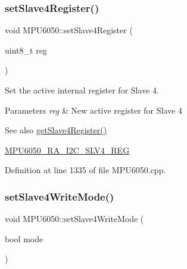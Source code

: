 \subsubsection{\texorpdfstring{setSlave4Register()}{setSlave4Register()}}
{\footnotesize\ttfamily void M\+P\+U6050\+::set\+Slave4\+Register (\begin{DoxyParamCaption}\item[{uint8\+\_\+t}]{reg }\end{DoxyParamCaption})}

Set the active internal register for Slave 4. 
\begin{DoxyParams}{Parameters}
{\em reg} & New active register for Slave 4 \\
\hline
\end{DoxyParams}
\begin{DoxySeeAlso}{See also}
\mbox{\hyperlink{classMPU6050_a7bd548cb60ecceb27c72f026ec0a60f8}{get\+Slave4\+Register()}} 

\mbox{\hyperlink{MPU6050_8h_a5b2f24136f2f68b5d42652d16208d9d0}{M\+P\+U6050\+\_\+\+R\+A\+\_\+\+I2\+C\+\_\+\+S\+L\+V4\+\_\+\+R\+EG}} 
\end{DoxySeeAlso}


Definition at line 1335 of file M\+P\+U6050.\+cpp.


\begin{DoxyCode}{0}

\end{DoxyCode}
\mbox{\label{classMPU6050_af1402fe7f3e1cc0dedb6714351cbca4e}} 
\subsubsection{\texorpdfstring{setSlave4WriteMode()}{setSlave4WriteMode()}}
{\footnotesize\ttfamily void M\+P\+U6050\+::set\+Slave4\+Write\+Mode (\begin{DoxyParamCaption}\item[{bool}]{mode }\end{DoxyParamCaption})}

